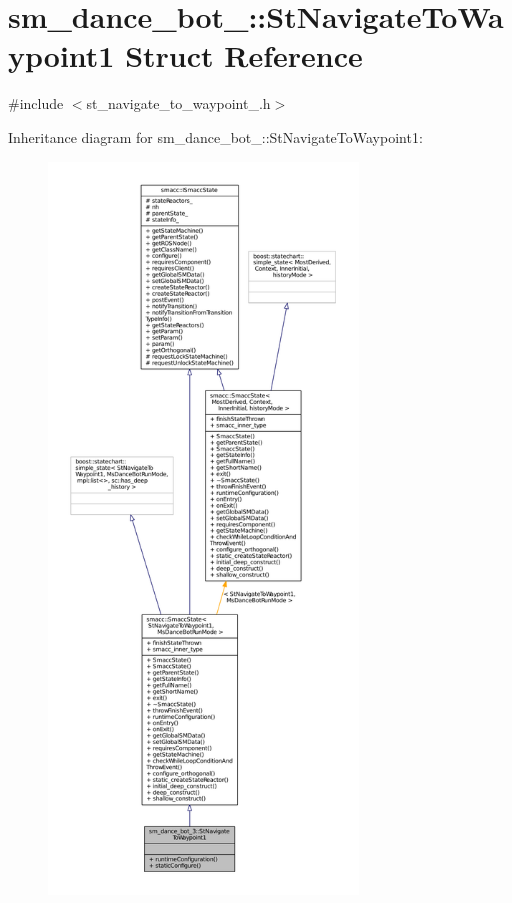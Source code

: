 \hypertarget{structsm__dance__bot__3_1_1StNavigateToWaypoint1}{}\section{sm\+\_\+dance\+\_\+bot\+\_\+:\+:St\+Navigate\+To\+Waypoint1 Struct Reference}
\label{structsm__dance__bot__3_1_1StNavigateToWaypoint1}


{\ttfamily \#include $<$st\+\_\+navigate\+\_\+to\+\_\+waypoint\+\_.\+h$>$}



Inheritance diagram for sm\+\_\+dance\+\_\+bot\+\_\+:\+:St\+Navigate\+To\+Waypoint1\+:
\nopagebreak
\begin{figure}[H]
\begin{center}
\leavevmode
\includegraphics[height=550pt]{structsm__dance__bot__3_1_1StNavigateToWaypoint1__inherit__graph}
\end{center}
\end{figure}


